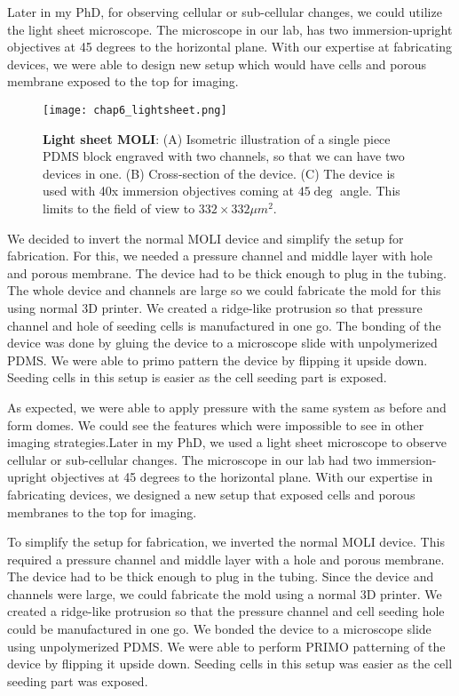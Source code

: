 Later in my PhD, for observing cellular or sub-cellular changes, we
could utilize the light sheet microscope. The microscope in our lab, has
two immersion-upright objectives at 45 degrees to the horizontal plane.
With our expertise at fabricating devices, we were able to design new
setup which would have cells and porous membrane exposed to the top for
imaging.

\begin{figure}[h]
	\centering
	\texttt{[image: chap6\_lightsheet.png]}
	\caption{ \textbf{Light sheet MOLI}: (A) Isometric illustration of a single piece PDMS block engraved with two channels, so that we can have two devices in one. (B) Cross-section of the device. (C) The device is used with 40x immersion objectives coming at $45 \deg$ angle. This limits to the field of view to $332\times 332\mu m^2$.
	}\label{fig_6_8}
\end{figure}

We decided to invert the normal MOLI device and simplify the setup for
fabrication. For this, we needed a pressure channel and middle layer
with hole and porous membrane. The device had to be thick enough to plug
in the tubing. The whole device and channels are large so we could
fabricate the mold for this using normal 3D printer. We created a
ridge-like protrusion so that pressure channel and hole of seeding cells
is manufactured in one go. The bonding of the device was done by gluing
the device to a microscope slide with unpolymerized PDMS. We were able
to primo pattern the device by flipping it upside down. Seeding cells in
this setup is easier as the cell seeding part is exposed.

As expected, we were able to apply pressure with the same system as
before and form domes. We could see the features which were impossible
to see in other imaging strategies.Later in my PhD, we used a light sheet microscope to observe cellular or
sub-cellular changes. The microscope in our lab had two
immersion-upright objectives at 45 degrees to the horizontal plane. With
our expertise in fabricating devices, we designed a new setup that
exposed cells and porous membranes to the top for imaging.

To simplify the setup for fabrication, we inverted the normal MOLI
device. This required a pressure channel and middle layer with a hole
and porous membrane. The device had to be thick enough to plug in the
tubing. Since the device and channels were large, we could fabricate the
mold using a normal 3D printer. We created a ridge-like protrusion so
that the pressure channel and cell seeding hole could be manufactured in
one go. We bonded the device to a microscope slide using unpolymerized
PDMS. We were able to perform PRIMO patterning of the device by flipping
it upside down. Seeding cells in this setup was easier as the cell
seeding part was exposed.

